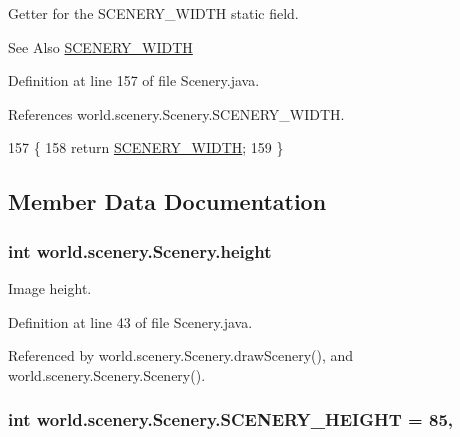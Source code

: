 Getter for the S\-C\-E\-N\-E\-R\-Y\-\_\-\-W\-I\-D\-T\-H static field. 

\begin{DoxySeeAlso}{See Also}
\hyperlink{classworld_1_1scenery_1_1_scenery_affb047c028883c6d069a03ef0f1caeb8}{S\-C\-E\-N\-E\-R\-Y\-\_\-\-W\-I\-D\-T\-H} 
\end{DoxySeeAlso}


Definition at line 157 of file Scenery.\-java.



References world.\-scenery.\-Scenery.\-S\-C\-E\-N\-E\-R\-Y\-\_\-\-W\-I\-D\-T\-H.


\begin{DoxyCode}
157                                         \{
158         \textcolor{keywordflow}{return} \hyperlink{classworld_1_1scenery_1_1_scenery_affb047c028883c6d069a03ef0f1caeb8}{SCENERY\_WIDTH};
159     \}
\end{DoxyCode}


\subsection{Member Data Documentation}
\hypertarget{classworld_1_1scenery_1_1_scenery_a54b4edfa060087e78a829105bf62a900}{
\subsubsection[{height}]{\setlength{\rightskip}{0pt plus 5cm}int world.\-scenery.\-Scenery.\-height\hspace{0.3cm}{\ttfamily [protected]}}}\label{classworld_1_1scenery_1_1_scenery_a54b4edfa060087e78a829105bf62a900}


Image height. 



Definition at line 43 of file Scenery.\-java.



Referenced by world.\-scenery.\-Scenery.\-draw\-Scenery(), and world.\-scenery.\-Scenery.\-Scenery().

\hypertarget{classworld_1_1scenery_1_1_scenery_a106e53ae6e1647395740237ccce7f363}{
\subsubsection[{S\-C\-E\-N\-E\-R\-Y\-\_\-\-H\-E\-I\-G\-H\-T}]{\setlength{\rightskip}{0pt plus 5cm}int world.\-scenery.\-Scenery.\-S\-C\-E\-N\-E\-R\-Y\-\_\-\-H\-E\-I\-G\-H\-T = 85\hspace{0.3cm}{\ttfamily [static]}, {\ttfamily [protected]}}}\label{classworld_1_1scenery_1_1_scenery_a106e53ae6e1647395740237ccce7f363}


